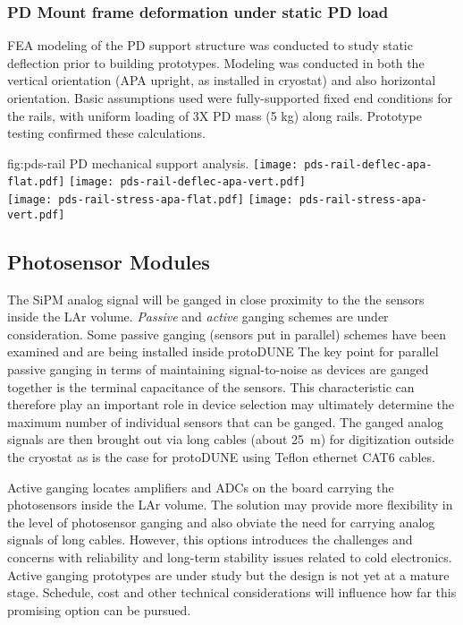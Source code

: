 \subsubsection{PD Mount frame deformation under static PD load}

FEA modeling of the PD support structure was conducted to study static deflection 
prior to building prototypes.  Modeling was conducted in both the vertical
 orientation (APA upright, as installed in cryostat) and also horizontal orientation.  
Basic assumptions used were fully-supported fixed end conditions for the rails, 
with uniform loading of 3X PD mass (5 kg) along rails.  
Prototype testing confirmed these calculations.

\begin{dunefigure}{fig:pds-rail}
{PD mechanical support analysis.}
	\texttt{[image: pds-rail-deflec-apa-flat.pdf]} 
	\texttt{[image: pds-rail-deflec-apa-vert.pdf]}\\
	\texttt{[image: pds-rail-stress-apa-flat.pdf]} 
	\texttt{[image: pds-rail-stress-apa-vert.pdf]}
\end{dunefigure}

\subsection{Photosensor Modules}
\label{sec:fdsp-pd-assy-psm}

The SiPM analog signal will be ganged in close proximity to the the sensors inside the
LAr volume. {\it Passive} and {\it active} ganging schemes are under consideration. Some passive
ganging (sensors put in parallel) schemes have been examined and are being installed inside
protoDUNE 
The key point for parallel passive ganging in terms of  maintaining signal-to-noise as devices are ganged together is the terminal capacitance of the sensors. This characteristic can therefore play an important role in device selection may ultimately determine  the maximum number of individual sensors that can be ganged. The ganged analog signals are then brought out via long cables (about 25~m) for digitization outside the cryostat as is the case for protoDUNE using Teflon ethernet CAT6 cables.

Active ganging locates amplifiers and ADCs on the board carrying  the photosensors inside the LAr volume. The solution
 may provide more flexibility in the level of photosensor ganging and also obviate the need for carrying analog signals of long cables.
However, this options introduces the challenges and concerns with reliability and long-term
stability issues related to cold electronics.  Active ganging prototypes are under study 
but the design is not yet at a mature stage. Schedule, cost and other technical
considerations will influence how far this promising option can be pursued.

